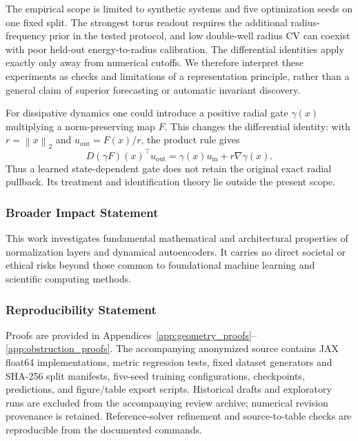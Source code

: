 \documentclass[10pt]{article}
\theoremstyle{definition}
\theoremstyle{remark}
\newcommand{\norm}[1]{\left\lVert #1 \right\rVert}
\begin{document}
The empirical scope is limited to synthetic systems and five optimization seeds on one fixed split. The strongest torus readout requires the additional radius-frequency prior in the tested protocol, and low double-well radius CV can coexist with poor held-out energy-to-radius calibration. The differential identities apply exactly only away from numerical cutoffs. We therefore interpret these experiments as checks and limitations of a representation principle, rather than a general claim of superior forecasting or automatic invariant discovery.

For dissipative dynamics one could introduce a positive radial gate $\gamma(x)$ multiplying a norm-preserving map $F$. This changes the differential identity: with $r=\norm x_2$ and $u_{\mathrm{out}}=F(x)/r$, the product rule gives
\begin{equation}
    D(\gamma F)(x)^\top u_{\mathrm{out}}
    =\gamma(x)u_{\mathrm{in}}+r\nabla\gamma(x).
\end{equation}
Thus a learned state-dependent gate does not retain the original exact radial pullback. Its treatment and identification theory lie outside the present scope.

\subsubsection*{Broader Impact Statement}
This work investigates fundamental mathematical and architectural properties of normalization layers and dynamical autoencoders. It carries no direct societal or ethical risks beyond those common to foundational machine learning and scientific computing methods.

\subsubsection*{Reproducibility Statement}
Proofs are provided in Appendices~\ref{app:geometry_proofs}--\ref{app:obstruction_proofs}. The accompanying anonymized source contains JAX float64 implementations, metric regression tests, fixed dataset generators and SHA-256 split manifests, five-seed training configurations, checkpoints, predictions, and figure/table export scripts. Historical drafts and exploratory runs are excluded from the accompanying review archive; numerical revision provenance is retained. Reference-solver refinement and source-to-table checks are reproducible from the documented commands.



\end{document}

